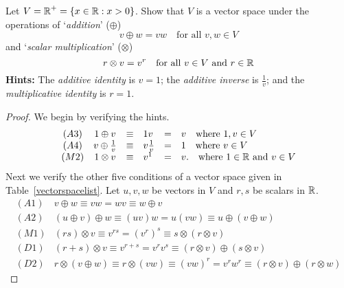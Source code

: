 \documentclass{ximera}
\author{Marty Golubitsky}
\begin{document}

\begin{exercise}\label{c5.1.95}

Let $V = \mbox{$\Bbb{R}$}^+ = \{x\in\mbox{$\Bbb{R}$}: x > 0\}$.  Show that $V$ is a vector space under the operations of `{\em addition}' ($\oplus$)
\[
v\oplus w = vw \quad  \mbox{for all $v,w\in V$}
\]
and `{\em scalar multiplication}' ($\otimes$)
\[
r\otimes v = v^r   \quad \mbox{for all $v\in V$ and $r\in\mbox{$\Bbb{R}$}$}
\]
{\bf Hints:} The {\em additive identity} is $v = 1$; the {\em additive inverse} is $\frac{1}{v}$; and the {\em multiplicative identity} is $r = 1$. 
  
\begin{solution}
\begin{proof}
We begin by verifying the hints.
\[
\begin{array}{ccclcl}
(A3) & 1\oplus v & \equiv & 1 v & = & v \quad \mbox{where $1,v\in V$}\\
(A4) & v\oplus \frac{1}{v} & \equiv & v\frac{1}{v} & = & 1 \quad \mbox{where $v\in V$}\\
(M2) & 1\otimes v & \equiv & v^1 & = & v. \quad \mbox{where $1\in\mbox{$\Bbb{R}$}$ and $v\in V$} 
\end{array}
\]
Next we verify the other five conditions of a vector space given in Table~\ref{vectorspacelist}.  Let $u,v,w$ be vectors in $V$ and $r,s$ be scalars in $\mbox{$\Bbb{R}$}$.
\[
\begin{array}{cl}
(A1) & v\oplus w \equiv vw = wv \equiv w\oplus v\\
(A2) & (u\oplus v)\oplus w \equiv (uv)w = u(vw) \equiv u\oplus(v\oplus w) \\ 
(M1) & (rs)\otimes v \equiv v^{rs} = (v^r)^s \equiv s\otimes (r\otimes v)\\
(D1) & (r + s)\otimes v \equiv v^{r+s} = v^r v^s \equiv (r\otimes v)\oplus (s\otimes v)\\
(D2) & r\otimes(v\oplus w) \equiv r\otimes (vw) \equiv (vw)^r = v^r w^r \equiv (r\otimes v)\oplus (r\otimes w)
\end{array}
\]
\end{proof} 

\end{solution}
\end{exercise}
\end{document}
